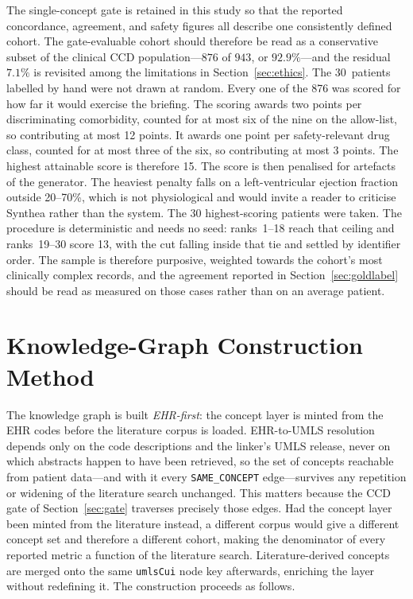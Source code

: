 The single-concept gate is retained in this study so that the reported concordance,
agreement, and safety figures all describe one consistently defined cohort. The
gate-evaluable cohort should therefore be read as a conservative subset of the clinical CCD
population---$876$ of $943$, or $92.9\%$---and the residual $7.1\%$ is revisited among the
limitations in Section~\ref{sec:ethics}.
The 30~patients labelled by hand were not drawn at random. Every one of the 876 was
scored for how far it would exercise the briefing. The scoring awards two points per discriminating comorbidity, counted
for at most six of the nine on the allow-list, so contributing at most 12 points. It awards
one point per safety-relevant drug class, counted for at most three of the six, so
contributing at most 3 points. The highest attainable score is therefore 15. The score is then penalised for artefacts of the generator. The heaviest
penalty falls on a left-ventricular ejection fraction outside 20--70\%, which is not
physiological and would invite a reader to criticise Synthea rather than the system. The 30 highest-scoring patients were taken. The
procedure is deterministic and needs no seed: ranks~1--18 reach that ceiling and
ranks~19--30 score 13, with the cut falling inside that tie and settled by identifier order.
The sample is therefore purposive, weighted towards the cohort's most clinically complex
records, and the agreement reported in Section~\ref{sec:goldlabel} should be read as
measured on those cases rather than on an average patient.

\section{Knowledge-Graph Construction Method}
\label{sec:kg-construction}

The knowledge graph is built \emph{EHR-first}: the concept layer is minted from the EHR codes
before the literature corpus is loaded. EHR-to-UMLS resolution depends only on the code
descriptions and the linker's UMLS release, never on which abstracts happen to have been
retrieved, so the set of concepts reachable from patient data---and with it every
\texttt{SAME\_CONCEPT} edge---survives any repetition or widening of the literature search
unchanged. This matters because the CCD gate of Section~\ref{sec:gate} traverses precisely
those edges. Had the concept layer been minted from the literature instead, a different corpus
would give a different concept set and therefore a different cohort, making the denominator of
every reported metric a function of the literature search. Literature-derived concepts are
merged onto the same \texttt{umlsCui} node key afterwards, enriching the layer without
redefining it. The construction proceeds as follows.

